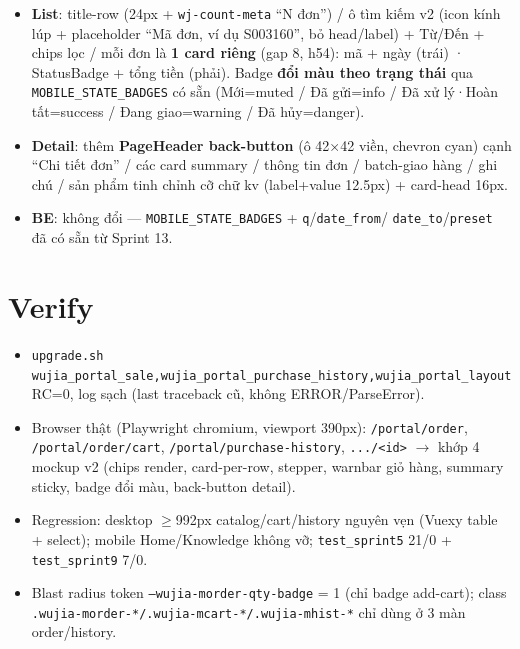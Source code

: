 \begin{itemize}
  \item \textbf{List}: title-row (24px + \texttt{wj-count-meta} ``N đơn'') / ô tìm kiếm v2 (icon kính
        lúp + placeholder ``Mã đơn, ví dụ S003160'', bỏ head/label) + Từ/Đến + chips lọc / mỗi đơn là
        \textbf{1 card riêng} (gap 8, h54): mã + ngày (trái) · StatusBadge + tổng tiền (phải).
        Badge \textbf{đổi màu theo trạng thái} qua \texttt{MOBILE\_STATE\_BADGES} có sẵn (Mới=muted /
        Đã gửi=info / Đã xử lý·Hoàn tất=success / Đang giao=warning / Đã hủy=danger).
  \item \textbf{Detail}: thêm \textbf{PageHeader back-button} (ô 42×42 viền, chevron cyan) cạnh
        ``Chi tiết đơn'' / các card summary / thông tin đơn / batch-giao hàng / ghi chú / sản phẩm
        tinh chỉnh cỡ chữ kv (label+value 12.5px) + card-head 16px.
  \item \textbf{BE}: không đổi --- \texttt{MOBILE\_STATE\_BADGES} + \texttt{q}/\texttt{date\_from}/
        \texttt{date\_to}/\texttt{preset} đã có sẵn từ Sprint 13.
\end{itemize}

\section{Verify}

\begin{itemize}
  \item \texttt{upgrade.sh wujia\_portal\_sale,wujia\_portal\_purchase\_history,wujia\_portal\_layout}
        RC=0, log sạch (last traceback cũ, không ERROR/ParseError).
  \item Browser thật (Playwright chromium, viewport 390px): \texttt{/portal/order},
        \texttt{/portal/order/cart}, \texttt{/portal/purchase-history}, \texttt{.../<id>}
        \(\rightarrow\) khớp 4 mockup v2 (chips render, card-per-row, stepper, warnbar giỏ hàng,
        summary sticky, badge đổi màu, back-button detail).
  \item Regression: desktop \(\ge\)992px catalog/cart/history nguyên vẹn (Vuexy table + select);
        mobile Home/Knowledge không vỡ; \texttt{test\_sprint5} 21/0 + \texttt{test\_sprint9} 7/0.
  \item Blast radius token \texttt{--wujia-morder-qty-badge} = 1 (chỉ badge add-cart); class
        \texttt{.wujia-morder-*/.wujia-mcart-*/.wujia-mhist-*} chỉ dùng ở 3 màn order/history.
\end{itemize}


